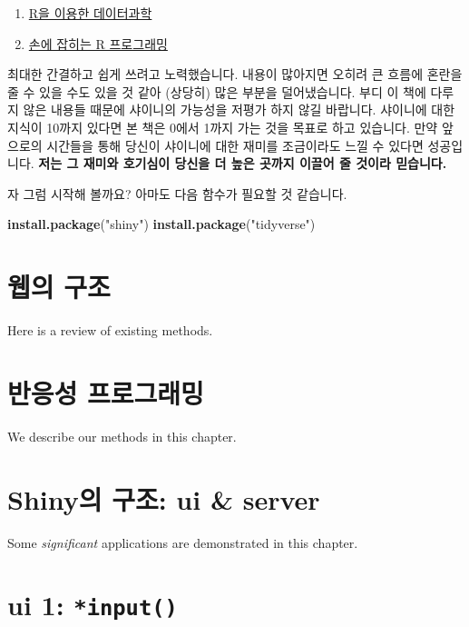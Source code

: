 \documentclass[]{book}
\newenvironment{Shaded}{\begin{snugshade}}{\end{snugshade}}
\newcommand{\KeywordTok}[1]{\textcolor[rgb]{0.13,0.29,0.53}{\textbf{#1}}}
\newcommand{\StringTok}[1]{\textcolor[rgb]{0.31,0.60,0.02}{#1}}
\newcommand{\NormalTok}[1]{#1}
\providecommand{\tightlist}{%
  \setlength{\itemsep}{0pt}\setlength{\parskip}{0pt}}
\begin{document}
\begin{enumerate}
\def\labelenumi{\arabic{enumi}.}
\tightlist
\item
  \href{https://r4ds.had.co.nz/}{R을 이용한 데이터과학}
\item
  \href{https://rstudio-education.github.io/hopr/}{손에 잡히는 R
  프로그래밍}
\end{enumerate}

최대한 간결하고 쉽게 쓰려고 노력했습니다. 내용이 많아지면 오히려 큰
흐름에 혼란을 줄 수 있을 수도 있을 것 같아 (상당히) 많은 부분을
덜어냈습니다. 부디 이 책에 다루지 않은 내용들 때문에 샤이니의 가능성을
저평가 하지 않길 바랍니다. 샤이니에 대한 지식이 10까지 있다면 본 책은
0에서 1까지 가는 것을 목표로 하고 있습니다. 만약 앞으로의 시간들을 통해
당신이 샤이니에 대한 재미를 조금이라도 느낄 수 있다면 성공입니다.
\textbf{저는 그 재미와 호기심이 당신을 더 높은 곳까지 이끌어 줄 것이라
믿습니다.}

자 그럼 시작해 볼까요? 아마도 다음 함수가 필요할 것 같습니다.

\begin{Shaded}
\begin{Highlighting}[]
\KeywordTok{install.package}\NormalTok{(}\StringTok{"shiny"}\NormalTok{)}
\KeywordTok{install.package}\NormalTok{(}\StringTok{"tidyverse"}\NormalTok{)}
\end{Highlighting}
\end{Shaded}

\chapter{웹의 구조}\label{web}

Here is a review of existing methods.

\chapter{반응성 프로그래밍}\label{reactive}

We describe our methods in this chapter.

\chapter{Shiny의 구조: ui \& server}\label{structure}

Some \emph{significant} applications are demonstrated in this chapter.

\chapter{\texorpdfstring{ui 1:
\texttt{*input()}}{ui 1: *input()}}\label{ui1}
\end{document}
